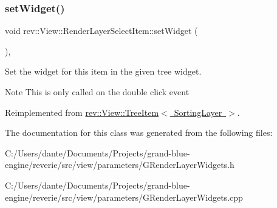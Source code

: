 \mbox{\label{classrev_1_1_view_1_1_render_layer_select_item_aa2dd6d026ec2c87552cb56d678e6975c}} 
\subsubsection{\texorpdfstring{setWidget()}{setWidget()}}
{\footnotesize\ttfamily void rev\+::\+View\+::\+Render\+Layer\+Select\+Item\+::set\+Widget (\begin{DoxyParamCaption}{ }\end{DoxyParamCaption})\hspace{0.3cm}{\ttfamily [override]}, {\ttfamily [virtual]}}



Set the widget for this item in the given tree widget. 

\begin{DoxyNote}{Note}
This is only called on the double click event 
\end{DoxyNote}


Reimplemented from \mbox{\hyperlink{classrev_1_1_view_1_1_tree_item_a24faa4e374ec0728c7eda8f50ca575df}{rev\+::\+View\+::\+Tree\+Item$<$ Sorting\+Layer $>$}}.



The documentation for this class was generated from the following files\+:\begin{DoxyCompactItemize}
\item 
C\+:/\+Users/dante/\+Documents/\+Projects/grand-\/blue-\/engine/reverie/src/view/parameters/G\+Render\+Layer\+Widgets.\+h\item 
C\+:/\+Users/dante/\+Documents/\+Projects/grand-\/blue-\/engine/reverie/src/view/parameters/G\+Render\+Layer\+Widgets.\+cpp\end{DoxyCompactItemize}
